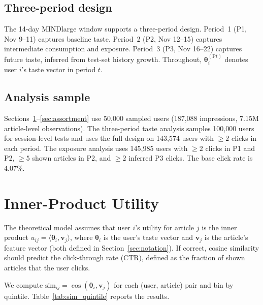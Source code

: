 \documentclass[11pt]{article}
\begin{document}
\subsection{Three-period design}
\label{sec:three_period_design}

The 14-day MINDlarge window supports a three-period design. Period~1 (P1, Nov 9--11) captures baseline taste. Period~2 (P2, Nov 12--15) captures intermediate consumption and exposure. Period~3 (P3, Nov 16--22) captures future taste, inferred from test-set history growth. Throughout, $\boldsymbol{\theta}_i^{(\text{P}t)}$ denotes user $i$'s taste vector in period $t$.

\subsection{Analysis sample}

Sections~\ref{sec:utility}--\ref{sec:assortment} use 50,000 sampled users (187,088 impressions, 7.15M article-level observations). The three-period taste analysis samples 100,000 users for session-level tests and uses the full design on 143,574 users with $\geq 2$ clicks in each period. The exposure analysis uses 145,985 users with $\geq 2$ clicks in P1 and P2, $\geq 5$ shown articles in P2, and $\geq 2$ inferred P3 clicks. The base click rate is 4.07\%.


\section{Inner-Product Utility}
\label{sec:utility}

The theoretical model assumes that user $i$'s utility for article $j$ is the inner product $u_{ij} = \langle \boldsymbol{\theta}_i, \mathbf{v}_j \rangle$, where $\boldsymbol{\theta}_i$ is the user's taste vector and $\mathbf{v}_j$ is the article's feature vector (both defined in Section~\ref{sec:notation}). If correct, cosine similarity should predict the click-through rate (CTR), defined as the fraction of shown articles that the user clicks.

We compute $\text{sim}_{ij} = \cos(\boldsymbol{\theta}_i, \mathbf{v}_j)$ for each (user, article) pair and bin by quintile. Table~\ref{tab:sim_quintile} reports the results.
\end{document}

